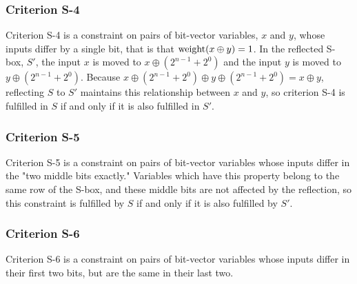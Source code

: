 \subsubsection{Criterion S-4}

Criterion S-4 is a constraint on pairs of bit-vector variables, $x$ and $y$, 
whose inputs differ by a single bit,
that is that $\operatorname{weight}(x \oplus y) = 1$.
In the reflected S-box, $S'$, the input
$x$ is moved to $x \oplus (2^{n-1} + 2^0)$ and
the input $y$ is moved to 
$y \oplus (2^{n-1} + 2^0)$.
Because 
$x \oplus (2^{n-1} + 2^0) \oplus y \oplus (2^{n-1} + 2^0) = x \oplus y$,
reflecting $S$ to $S'$ maintains this relationship between $x$ and $y$,
so criterion S-4 is fulfilled in $S$ if and only if it is also fulfilled in $S'$.
%

\subsubsection{Criterion S-5}
Criterion S-5 is a constraint on pairs of bit-vector variables whose inputs differ in the "two middle bits exactly." 
Variables which have this property belong to the same row of the S-box, and these middle bits are not 
affected by the reflection, so this constraint is fulfilled by $S$ if and only if it is also fulfilled by $S'$.

\subsubsection{Criterion S-6}
Criterion S-6 is a constraint on pairs of bit-vector variables whose inputs differ in their first two bits,
but are the same in their last two.

